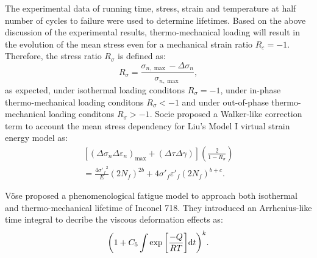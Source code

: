 \documentclass[preprint,5p,twocolumn,11pt,sort&compress]{elsarticle}
\begin{document}
The experimental data of running time, stress, strain and temperature at half number of cycles to failure were used to determine lifetimes.
Based on the above discussion of the experimental results, thermo-mechanical loading  will result in the evolution of the mean stress even for a mechanical strain ratio $R_{\varepsilon}=-1$. Therefore, the stress ratio ${R_\sigma }$ is defined as:
\begin{equation}
{R_\sigma } = \frac{{{\sigma _{n,\max }} - \Delta {\sigma _n}}}{{{\sigma _{n,\max }}}},
\end{equation}
as expected, under isothermal loading conditons ${R_\sigma }=-1$, under in-phase thermo-mechanical loading conditons ${R_\sigma }<-1$ and under out-of-phase thermo-mechanical loading conditons ${R_\sigma }>-1$.
Socie \cite{Socie2000} proposed a Walker-like correction term\cite{Walker1970} to account the mean stress dependency for Liu's Model I virtual strain energy model as:
\begin{equation}
\begin{aligned}
\left[ {{{\left( {\Delta {\sigma _n}\Delta {\varepsilon _n}} \right)}_{\max }} + \left( {\Delta \tau \Delta \gamma } \right)} \right]\left( {\frac{2}{{1 - {R_\sigma }}}} \right)\\
= \frac{{4{{\sigma '}_f}^2}}{E}{\left( {2{N_f}} \right)^{2b}} + 4{{\sigma '}_f}{{\varepsilon '}_f}{\left( {2{N_f}} \right)^{b + c}}.
\end{aligned}
\label{Equ:StudyModel}
\end{equation}

V\"{o}se \cite{Vose2013} proposed a phenomenological fatigue model to approach both isothermal and thermo-mechanical lifetime of Inconel 718. They introduced an Arrhenius-like time integral to decribe the viscous deformation effects as:
\begin{equation}
{\left( {1 + {C_5}\int {\exp \left[ {\frac{{ - Q}}{{RT}}} \right]} {\rm{d}}t} \right)^k}.
\end{equation}

\end{document}
